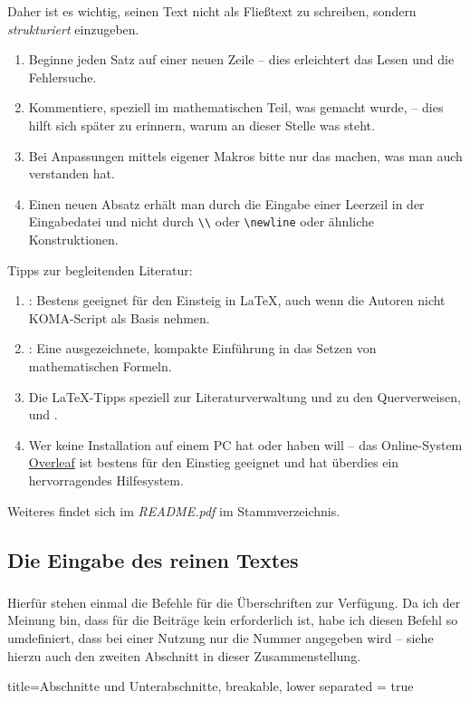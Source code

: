 \begin{refsection}
Daher ist es wichtig, seinen Text nicht als Fließtext zu schreiben, sondern \emph{strukturiert} einzugeben.
\begin{enumerate}[--]
	\item
		Beginne jeden Satz auf einer neuen Zeile -- dies erleichtert das Lesen und die Fehlersuche.
	
	\item
		Kommentiere, speziell im mathematischen Teil, was gemacht wurde, -- dies hilft sich später zu erinnern, warum an dieser Stelle was steht.
		
	\item
		Bei Anpassungen mittels eigener Makros bitte nur das machen, was man auch verstanden hat.
		
	\item
	Einen neuen Absatz erhält man durch die Eingabe einer Leerzeil in der Eingabedatei und nicht durch \verb|\\| oder \verb|\newline| oder ähnliche Konstruktionen.
			
\end{enumerate}
Tipps zur begleitenden Literatur:
\begin{enumerate}[--]
	\item
	\textcite{lshort-german}: Bestens geeignet für den Einsteig in \LaTeX{}, auch wenn die Autoren nicht KOMA-Script als Basis nehmen.
	
	\item
	\textcite{short-math-guide}: Eine ausgezeichnete, kompakte Einführung in das Setzen von mathematischen Formeln.
	
	\item
	Die \LaTeX{}-Tipps speziell zur Literaturverwaltung und  zu den Querverweisen, \textcite{latextipps5} und \textcite{latextipps2}.
	
	\item
	Wer keine Installation auf einem PC hat oder haben will -- das Online-System \href{https://www.overleaf.com}{Overleaf} ist bestens für den Einstieg geeignet und hat überdies ein hervorragendes Hilfesystem. 
	
\end{enumerate}
Weiteres findet sich im \emph{README.pdf} im Stammverzeichnis.
\subsection*{Die Eingabe des reinen Textes}
\subsubsection{}
Hierfür stehen einmal die Befehle für die Überschriften zur Verfügung.
Da ich der Meinung bin, dass für die Beiträge kein  erforderlich ist, habe ich diesen Befehl so umdefiniert, dass bei einer Nutzung nur die Nummer angegeben wird -- siehe hierzu auch den zweiten Abschnitt in dieser Zusammenstellung.
%
\begin{tcblisting}{title=Abschnitte und Unterabschnitte, breakable,  lower separated = true}

\end{tcblisting}
\end{refsection}
